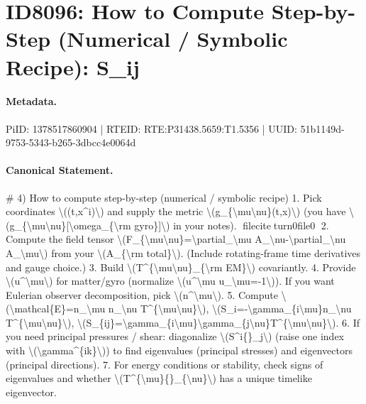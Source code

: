 \section*{ID8096: How to Compute Step-by-Step (Numerical / Symbolic Recipe): S\_ij}
\paragraph{Metadata.}
PiID: 1378517860904 | RTEID: RTE:P31438.5659:T1.5356 | UUID: 51b1149d-9753-5343-b265-3dbcc4e0064d

\paragraph{Canonical Statement.}
\# 4) How to compute step-by-step (numerical / symbolic recipe) 1. Pick coordinates \textbackslash{}((t,x\textasciicircum{}i)\textbackslash{}) and supply the metric \textbackslash{}(g\_\{\textbackslash{}mu\textbackslash{}nu\}(t,x)\textbackslash{}) (you have \textbackslash{}(g\_\{\textbackslash{}mu\textbackslash{}nu\}[\textbackslash{}omega\_\{\textbackslash{}rm gyro\}]\textbackslash{}) in your notes). fileciteturn0file0 2. Compute the field tensor \textbackslash{}(F\_\{\textbackslash{}mu\textbackslash{}nu\}=\textbackslash{}partial\_\textbackslash{}mu A\_\textbackslash{}nu-\textbackslash{}partial\_\textbackslash{}nu A\_\textbackslash{}mu\textbackslash{}) from your \textbackslash{}(A\_\{\textbackslash{}rm total\}\textbackslash{}). (Include rotating-frame time derivatives and gauge choice.) 3. Build \textbackslash{}(T\textasciicircum{}\{\textbackslash{}mu\textbackslash{}nu\}\_\{\textbackslash{}rm EM\}\textbackslash{}) covariantly. 4. Provide \textbackslash{}(u\textasciicircum{}\textbackslash{}mu\textbackslash{}) for matter/gyro (normalize \textbackslash{}(u\textasciicircum{}\textbackslash{}mu u\_\textbackslash{}mu=-1\textbackslash{})). If you want Eulerian observer decomposition, pick \textbackslash{}(n\textasciicircum{}\textbackslash{}mu\textbackslash{}). 5. Compute \textbackslash{}(\textbackslash{}mathcal\{E\}=n\_\textbackslash{}mu n\_\textbackslash{}nu T\textasciicircum{}\{\textbackslash{}mu\textbackslash{}nu\}\textbackslash{}), \textbackslash{}(S\_i=-\textbackslash{}gamma\_\{i\textbackslash{}mu\}n\_\textbackslash{}nu T\textasciicircum{}\{\textbackslash{}mu\textbackslash{}nu\}\textbackslash{}), \textbackslash{}(S\_\{ij\}=\textbackslash{}gamma\_\{i\textbackslash{}mu\}\textbackslash{}gamma\_\{j\textbackslash{}nu\}T\textasciicircum{}\{\textbackslash{}mu\textbackslash{}nu\}\textbackslash{}). 6. If you need principal pressures / shear: diagonalize \textbackslash{}(S\textasciicircum{}i\{\}\_j\textbackslash{}) (raise one index with \textbackslash{}(\textbackslash{}gamma\textasciicircum{}\{ik\}\textbackslash{})) to find eigenvalues (principal stresses) and eigenvectors (principal directions). 7. For energy conditions or stability, check signs of eigenvalues and whether \textbackslash{}(T\textasciicircum{}\{\textbackslash{}mu\}\{\}\_\{\textbackslash{}nu\}\textbackslash{}) has a unique timelike eigenvector.

